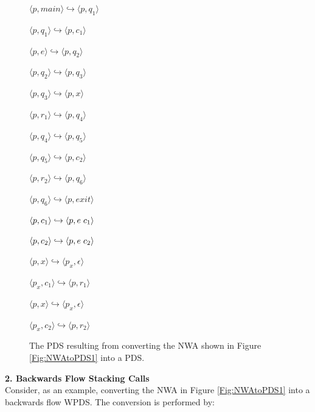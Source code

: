 \documentclass{llncs}
\begin{document}
\begin{figure}[htbp]
  \centering
    \begin{description}
      \centering
      \item $\langle p,main \rangle \hookrightarrow \langle p,q_1 \rangle$
      \item $\langle p,q_1 \rangle \hookrightarrow \langle p,c_1 \rangle$
      \item $\langle p,e \rangle \hookrightarrow \langle p,q_2 \rangle$
      \item $\langle p,q_2 \rangle \hookrightarrow \langle p,q_3 \rangle$
      \item $\langle p,q_3 \rangle \hookrightarrow \langle p,x \rangle$
      \item $\langle p,r_1 \rangle \hookrightarrow \langle p,q_4 \rangle$
      \item $\langle p,q_4 \rangle \hookrightarrow \langle p,q_5 \rangle$
      \item $\langle p,q_5 \rangle \hookrightarrow \langle p,c_2 \rangle$
      \item $\langle p,r_2 \rangle \hookrightarrow \langle p,q_6 \rangle$
      \item $\langle p,q_6 \rangle \hookrightarrow \langle p,exit \rangle$
      \item $\langle p,c_1 \rangle \hookrightarrow \langle p,e \hspace{.1cm} c_1 \rangle$
      \item $\langle p,c_2 \rangle \hookrightarrow \langle p,e \hspace{.1cm} c_2 \rangle$
      \item $\langle p,x \rangle \hookrightarrow \langle p_x, \epsilon \rangle$
      \item $\langle p_x,c_1 \rangle \hookrightarrow \langle p,r_1 \rangle$
      \item $\langle p,x \rangle \hookrightarrow \langle p_x, \epsilon \rangle$
      \item $\langle p_x,c_2 \rangle \hookrightarrow \langle p,r_2 \rangle$
    \end{description}
  \caption{The PDS resulting from converting the NWA shown in Figure \ref{Fig:NWAtoPDS1} into a PDS.}
  \label{Fig:NWAtoPDS4}
\end{figure}

\noindent \textbf{2. Backwards Flow Stacking Calls} \\

\noindent Consider, as an example, converting the NWA in Figure \ref{Fig:NWAtoPDS1} into a backwards flow WPDS.  The conversion is performed by:
\end{document}
